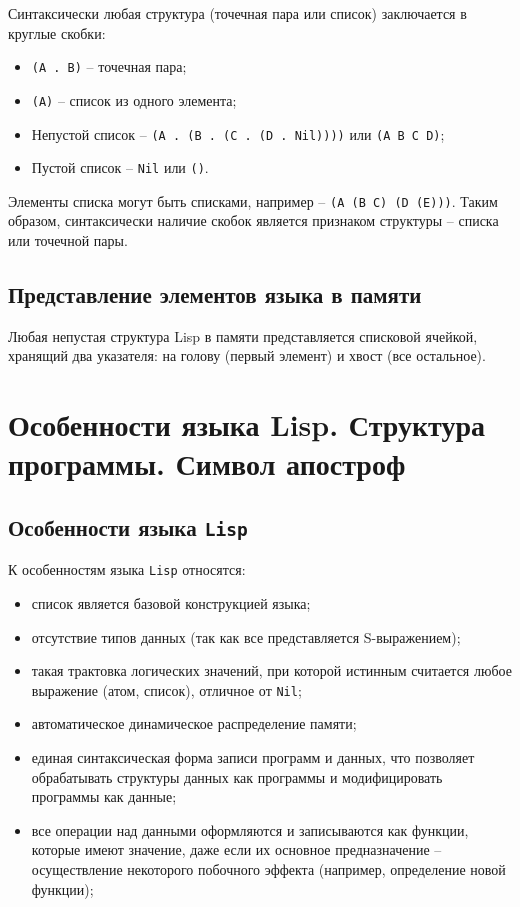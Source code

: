 Синтаксически любая структура (точечная пара или список) заключается в круглые скобки:
\begin{itemize}
    \item \texttt{(A . B)} -- точечная пара;
    \item \texttt{(A)} -- список из одного элемента;
    \item Непустой список -- \texttt{(A . (B . (C . (D . Nil))))} или \texttt{(A B C D)};
    \item Пустой список -- \texttt{Nil} или \texttt{()}.
\end{itemize}

Элементы списка могут быть списками, например -- \texttt{(A (B C) (D (E)))}. Таким образом, синтаксически наличие скобок является признаком структуры -- списка или точечной пары.

\subsection*{Представление элементов языка в памяти}

Любая непустая структура Lisp в памяти представляется списковой ячейкой, хранящий два указателя: на голову (первый элемент) и хвост (все остальное).

\section{Особенности языка Lisp. Структура программы. Символ апостроф}

\subsection*{Особенности языка \texttt{Lisp}}

К особенностям языка \texttt{Lisp} относятся:
\begin{itemize}
    \item список является базовой конструкцией языка;
    \item отсутствие типов данных (так как все представляется S-выражением);
    \item такая трактовка логических значений, при которой истинным считается любое выражение (атом, список), отличное от \texttt{Nil};
    \item автоматическое динамическое распределение памяти;
    \item единая синтаксическая форма записи программ и данных, что позволяет обрабатывать структуры данных как программы и модифицировать программы как данные;
    \item все операции над данными оформляются и записываются как функции, которые имеют значение, даже если их основное предназначение -- осуществление некоторого побочного эффекта (например, определение новой функции);
\end{itemize}

